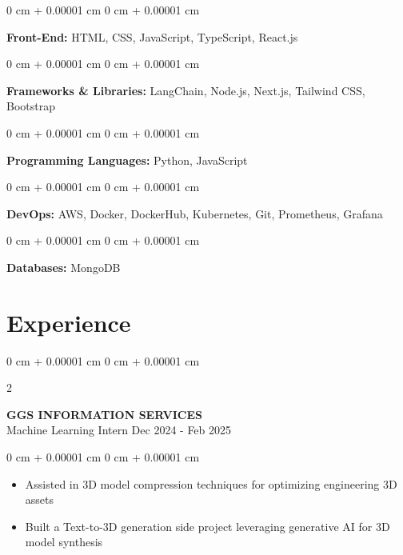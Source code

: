 \documentclass[10pt, letterpaper]{article}
\newenvironment{highlights}{
    \begin{itemize}[
        topsep=0.10 cm,
        parsep=0.10 cm,
        partopsep=0pt,
        itemsep=0pt,
        leftmargin=0 cm + 10pt
    ]
}{
    \end{itemize}
} %
\newenvironment{onecolentry}{
    \begin{adjustwidth}{
        0 cm + 0.00001 cm
    }{
        0 cm + 0.00001 cm
    }
}{
    \end{adjustwidth}
} %
\newenvironment{twocolentry}[2][]{
    \onecolentry
    \def\secondColumn{#2}
    \setcolumnwidth{\fill, 4.5 cm}
    \begin{paracol}{2}
}{
    \switchcolumn \raggedleft \secondColumn
    \end{paracol}
    \endonecolentry
} %
\begin{document}
    \vspace{0.2 cm}

    \begin{onecolentry}
        \textbf{{Front-End:}} HTML, CSS, JavaScript, TypeScript, React.js
    \end{onecolentry}

    \vspace{0.2 cm}

    \begin{onecolentry}
        \textbf{{Frameworks \& Libraries:}} LangChain, Node.js, Next.js, Tailwind CSS, Bootstrap
    \end{onecolentry}

    \vspace{0.2 cm}

    \begin{onecolentry}
        \textbf{{Programming Languages:}} Python, JavaScript
    \end{onecolentry}

    \vspace{0.2 cm}

    \begin{onecolentry}
        \textbf{{DevOps:}} AWS, Docker, DockerHub, Kubernetes, Git, Prometheus, Grafana
    \end{onecolentry}

    \vspace{0.2 cm}
    
    \begin{onecolentry}
        \textbf{{Databases:}} MongoDB
    \end{onecolentry}

    \section{Experience}
    \begin{twocolentry}{
        Dec 2024 - Feb 2025
    }
        \textbf{GGS INFORMATION SERVICES} \\
        Machine Learning Intern\end{twocolentry}

    \vspace{0.10 cm}
    \begin{onecolentry}
        \begin{highlights}
            \item Assisted in 3D model compression techniques for optimizing engineering 3D assets
            \item Built a Text-to-3D generation side project leveraging generative AI for 3D model synthesis
        \end{highlights}
    \end{onecolentry}
\end{document}
